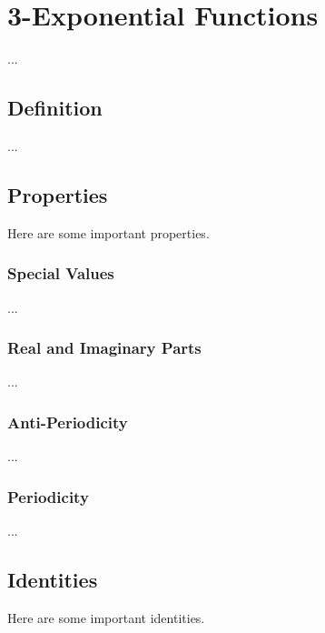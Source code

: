 \chapter{3-Exponential Functions}
...
\section{Definition}
...
\section{Properties}
Here are some important properties.
\subsection{Special Values}
...
\subsection{Real and Imaginary Parts}
...
\subsection{Anti-Periodicity}
...
\subsection{Periodicity}
...
\section{Identities}
Here are some important identities.
